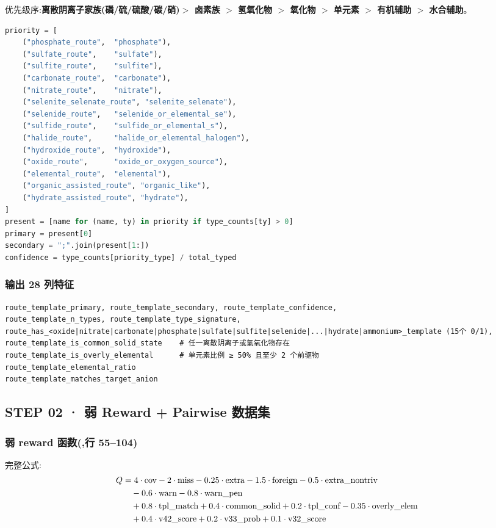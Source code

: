 优先级序:\textbf{离散阴离子家族(磷/硫/硫酸/碳/硝)$>$ 卤素族 $>$ 氢氧化物 $>$ 氧化物 $>$ 单元素 $>$ 有机辅助 $>$ 水合辅助}。

\begin{lstlisting}[language=Python]
priority = [
    ("phosphate_route",  "phosphate"),
    ("sulfate_route",    "sulfate"),
    ("sulfite_route",    "sulfite"),
    ("carbonate_route",  "carbonate"),
    ("nitrate_route",    "nitrate"),
    ("selenite_selenate_route", "selenite_selenate"),
    ("selenide_route",   "selenide_or_elemental_se"),
    ("sulfide_route",    "sulfide_or_elemental_s"),
    ("halide_route",     "halide_or_elemental_halogen"),
    ("hydroxide_route",  "hydroxide"),
    ("oxide_route",      "oxide_or_oxygen_source"),
    ("elemental_route",  "elemental"),
    ("organic_assisted_route", "organic_like"),
    ("hydrate_assisted_route", "hydrate"),
]
present = [name for (name, ty) in priority if type_counts[ty] > 0]
primary = present[0]
secondary = ";".join(present[1:])
confidence = type_counts[priority_type] / total_typed
\end{lstlisting}

\subsubsection{输出 28 列特征}

\begin{lstlisting}
route_template_primary, route_template_secondary, route_template_confidence,
route_template_n_types, route_template_type_signature,
route_has_<oxide|nitrate|carbonate|phosphate|sulfate|sulfite|selenide|...|hydrate|ammonium>_template (15个 0/1),
route_template_is_common_solid_state    # 任一离散阴离子或氢氧化物存在
route_template_is_overly_elemental      # 单元素比例 ≥ 50% 且至少 2 个前驱物
route_template_elemental_ratio
route_template_matches_target_anion
\end{lstlisting}

\subsection{STEP 02 · 弱 Reward + Pairwise 数据集}

\subsubsection{弱 reward 函数(,行 55--104)}

完整公式:
\begin{align}
Q &= 4\cdot \text{cov} - 2\cdot \text{miss} - 0.25\cdot \text{extra} - 1.5\cdot \text{foreign} - 0.5\cdot \text{extra\_nontriv} \notag \\
  &\quad - 0.6\cdot \text{warn} - 0.8\cdot \text{warn\_pen} \notag \\
  &\quad + 0.8\cdot \text{tpl\_match} + 0.4\cdot \text{common\_solid} + 0.2\cdot \text{tpl\_conf} - 0.35\cdot \text{overly\_elem} \notag \\
  &\quad + 0.4\cdot \text{v42\_score} + 0.2\cdot \text{v33\_prob} + 0.1\cdot \text{v32\_score}
\end{align}

